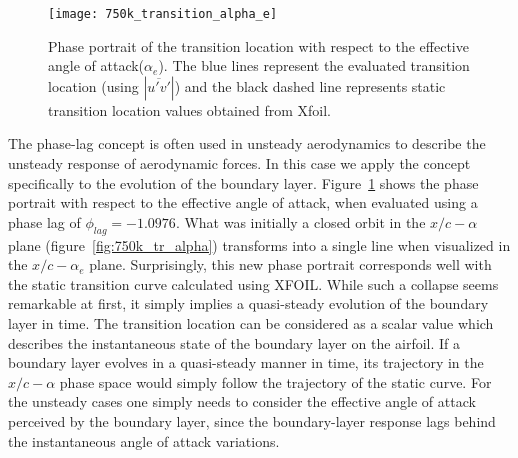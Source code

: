 \begin{figure}[h]
	\centering
	\texttt{[image: 750k\_transition\_alpha\_e]}
	\vspace{5pt}
	\caption{Phase portrait of the transition location with respect to the effective angle of attack($\alpha_{e}$). The blue lines represent the evaluated transition location (using $|\overline{u'v'}|$) and the black dashed line represents static transition location values obtained from Xfoil.}
	\label{fig:750k_transition_phase_lag}
\end{figure}

The phase-lag concept is often used in unsteady aerodynamics \citep{theodorsen35,leishman00,bisplingoff00,mccroskey82,ericsson_stall88a} to describe the unsteady response of aerodynamic forces. In this case we apply the concept specifically to the evolution of the boundary layer. Figure~\ref{fig:750k_transition_phase_lag} shows the phase portrait with respect to the effective angle of attack, when evaluated using a phase lag of $\phi_{lag}=-1.0976$. What was initially a closed orbit in the $x/c-\alpha$ plane (figure~\ref{fig:750k_tr_alpha}) transforms into a single line when visualized in the $x/c-\alpha_{e}$ plane. Surprisingly, this new phase portrait corresponds well with the static transition curve calculated using XFOIL. While such a collapse seems remarkable at first, it simply implies a quasi-steady evolution of the boundary layer in time. The transition location can be considered as a scalar value which describes the instantaneous state of the boundary layer on the airfoil. If a boundary layer evolves in a quasi-steady manner in time, its trajectory in the $x/c-\alpha$ phase space would simply follow the trajectory of the static curve. For the unsteady cases one simply needs to consider the effective angle of attack perceived by the boundary layer, since the boundary-layer response lags behind the instantaneous angle of attack variations.

